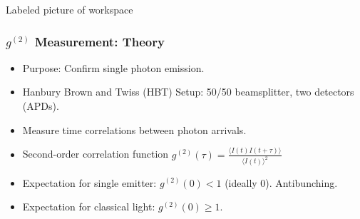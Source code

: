 \documentclass{beamer}
\begin{document}
\begin{frame}{Labeled picture of workspace}
    
\end{frame}


\begin{frame}
\frametitle{$g^{(2)}$ Measurement: Theory}
\begin{itemize}
    \item Purpose: Confirm single photon emission.
    \item Hanbury Brown and Twiss (HBT) Setup: 50/50 beamsplitter, two detectors (APDs).
    \item Measure time correlations between photon arrivals.
    \item Second-order correlation function $g^{(2)}(\tau) = \frac{\langle I(t)I(t+\tau) \rangle}{\langle I(t) \rangle^2}$
    \item Expectation for single emitter: $g^{(2)}(0) < 1$ (ideally 0). Antibunching.
    \item Expectation for classical light: $g^{(2)}(0) \ge 1$.
\end{itemize}
\end{frame}
\end{document}
